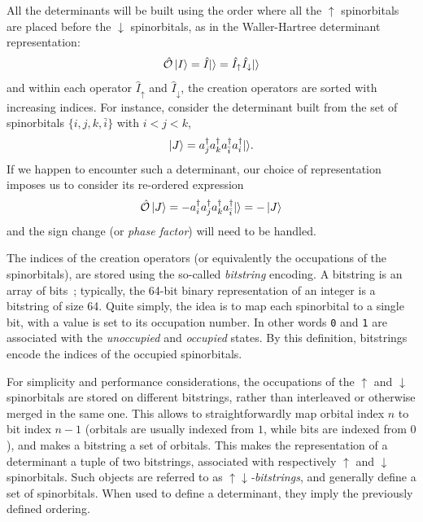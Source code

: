 \documentclass[./thesis.tex]{subfiles}
\begin{document}
All the determinants will be built using the order where all the $\uparrow$ spinorbitals are placed before the $\downarrow$ spinorbitals, as in the Waller-Hartree determinant representation:
\begin{equation}
\label{eq:spinpack}
{\hat{\mathcal{O}}} \ket{I} = \hat{I} {\ket{}} = \hat{I}_\uparrow \hat{I}_\downarrow {\ket{}} 
\end{equation}
and within each operator $\hat{I}_\uparrow$ and $\hat{I}_\downarrow$, the creation operators are sorted with increasing indices.
For instance, consider the determinant built from the set of spinorbitals $\{i,j,k,{\bar i} \}$ with $i<j<k$,
\begin{equation}
\ket{J} = a^\dagger_{j} a^\dagger_{k} a^\dagger_{\bar i} a^\dagger_{i} {\ket{}}.
\end{equation}
If we happen to encounter such a determinant, our choice of representation imposes us to consider its re-ordered expression
\begin{equation}
{\hat{\mathcal{O}}} \ket{J} = - a^\dagger_{i} a^\dagger_{j} a^\dagger_{k} a^\dagger_{\bar i} {\ket{}} = -\ket{J}
\end{equation}
and the sign change (or \emph{phase factor}) will need to be handled.

The indices of the creation operators (or equivalently the
occupations of the spinorbitals), are stored using the so-called \emph{bitstring} encoding. A bitstring is an array of bits~; typically, the 64-bit binary representation of an integer is a bitstring of size 64.
Quite simply, the idea is to map each spinorbital to a single bit, with a value is set to its occupation number. In other words \texttt{0} and \texttt{1} are associated with the \emph{unoccupied} and \emph{occupied} states.
By this definition, bitstrings encode the indices of the occupied spinorbitals.

For simplicity and performance considerations, the occupations of the $\uparrow$ and $\downarrow$ spinorbitals are stored on different bitstrings, rather than interleaved or otherwise merged in the same one. This allows to straightforwardly map orbital index $n$ to bit index $n-1$ (orbitals are usually indexed from $1$, while bits are indexed from $0$), and makes a bitstring a set of orbitals.
This makes the representation of a determinant a tuple of two bitstrings, associated with respectively $\uparrow$ and $\downarrow$ spinorbitals. Such objects are referred to as \emph{$\uparrow\downarrow$-bitstrings}, and generally define a set of spinorbitals. When used to define a determinant, they imply the previously defined ordering.
\end{document}
